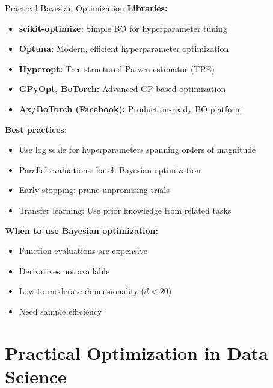 \documentclass[aspectratio=169]{beamer}
\begin{document}
\begin{frame}{Practical Bayesian Optimization}
  \textbf{Libraries:}
  \begin{itemize}
    \item \textbf{scikit-optimize:} Simple BO for hyperparameter tuning
    \item \textbf{Optuna:} Modern, efficient hyperparameter optimization
    \item \textbf{Hyperopt:} Tree-structured Parzen estimator (TPE)
    \item \textbf{GPyOpt, BoTorch:} Advanced GP-based optimization
    \item \textbf{Ax/BoTorch (Facebook):} Production-ready BO platform
  \end{itemize}

  \vspace{0.5em}

  \textbf{Best practices:}
  \begin{itemize}
    \item Use log scale for hyperparameters spanning orders of magnitude
    \item Parallel evaluations: batch Bayesian optimization
    \item Early stopping: prune unpromising trials
    \item Transfer learning: Use prior knowledge from related tasks
  \end{itemize}

  \vspace{0.5em}

  \textbf{When to use Bayesian optimization:}
  \begin{itemize}
    \item Function evaluations are expensive
    \item Derivatives not available
    \item Low to moderate dimensionality ($d < 20$)
    \item Need sample efficiency
  \end{itemize}
\end{frame}

\section{Practical Optimization in Data Science}
\end{document}
